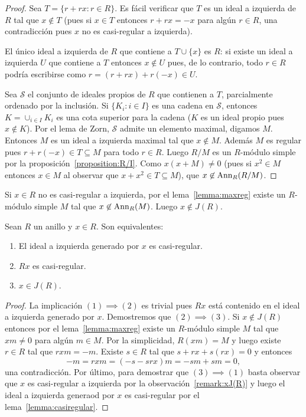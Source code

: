 \begin{proof}
	Sea $T=\{r+rx:r\in R\}$. Es fácil verificar que $T$ es un ideal a izquierda
	de $R$ tal que $x\not\in T$ (pues si $x\in T$ entonces $r+rx=-x$ para algún
	$r\in R$, una contradicción pues $x$ no es casi-regular a izquierda). 

	El único ideal a izquierda de $R$ que contiene
	a $T\cup\{x\}$ es $R$:  si existe un ideal a izquierda $U$ que contiene a $T$
	entonces $x\not\in U$ pues, de lo contrario, todo $r\in R$ podría
	escribirse como $r=(r+rx)+r(-x)\in U$. 

	Sea $\mathcal{S}$ el conjunto de ideales propios de $R$ que contienen a
	$T$, parcialmente ordenado por la inclusión. Si $\{K_i:i\in I\}$ es una
	cadena en $\mathcal{S}$, entonces $K=\cup_{i\in I}K_i$ es una cota superior
	para la cadena ($K$ es un ideal propio pues $x\not\in K$). Por el lema de
	Zorn, $\mathcal{S}$ admite un elemento maximal, digamos $M$. Entonces $M$
	es un ideal a izquierda maximal tal que $x\not\in M$. Además $M$ es regular
	pues $r+r(-x)\in T\subseteq M$ para todo $r\in R$. Luego $R/M$ es un
	$R$-módulo simple por la proposición~\ref{proposition:R/I}. Como $x(x+M)\ne
	0$ (pues si $x^2\in M$ entonces $x\in M$ al observar que $x+x^2\in
	T\subseteq M$), que $x\not\in\operatorname{Ann}_R(R/M)$.
\end{proof}

\begin{remark}
	\label{remark:xJ(R)}
	Si $x\in R$ no es casi-regular a izquierda, por el lema~\ref{lemma:maxreg}
	existe un $R$-módulo simple $M$ tal que $x\not\in\operatorname{Ann}_R(M)$. Luego
	$x\not\in J(R)$.
\end{remark}

\begin{theorem}
	\label{thm:casireg_eq}
	Sean $R$ un anillo y $x\in R$. Son
	equivalentes:
	\begin{enumerate}
		\item El ideal a izquierda generado por $x$ es casi-regular.
		\item $Rx$ es casi-regular.
		\item $x\in J(R)$.
	\end{enumerate}
\end{theorem}

\begin{proof}
	La implicación $(1)\implies(2)$ es trivial pues $Rx$ está contenido en el
	ideal a izquierda generado por $x$.  Demostremos que $(2)\implies(3)$. Si
	$x\not\in J(R)$ entonces por el lema~\ref{lemma:maxreg} existe un
	$R$-módulo simple $M$ tal que $xm\ne 0$ para algún $m\in M$. Por la
	simplicidad, $R(xm)=M$ y luego existe $r\in R$ tal que $rxm=-m$. Existe
	$s\in R$ tal que $s+rx+s(rx)=0$ y entonces
	\[
	-m=rxm=(-s-srx)m=-sm+sm=0,
	\]
	una contradicción. Por último, para demostrar que $(3)\implies(1)$ basta
	observar que $x$ es casi-regular a izquierda por la
	observación~\ref{remark:xJ(R)} y luego el ideal a izquierda generaod por
	$x$ es casi-regular por el lema~\ref{lemma:casiregular}.
\end{proof}


